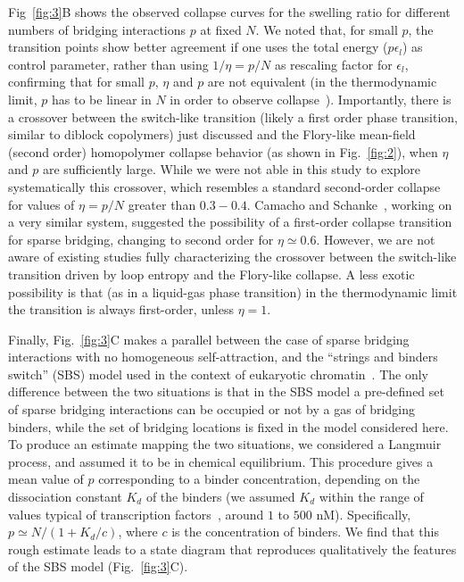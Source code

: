 \documentclass[
preprint,
a4paper,
12pt,
superscriptaddress,
pre]{revtex4}
\begin{document}
%
Fig~\ref{fig:3}B shows the observed collapse curves for the swelling
ratio for different numbers of bridging interactions $p$ at fixed
$N$. 
%
We noted that, for small $p$, the transition points show better
agreement if one uses the total energy ($p \epsilon_l$) as control
parameter, rather than using $1/\eta=p/N$ as rescaling factor for
$\epsilon_l$, confirming that for small $p$, $\eta$ and $p$ are not
equivalent (in the thermodynamic limit, $p$ has to be linear in $N$ in
order to observe collapse~\cite{Kantor1996,Camacho1997}).
%
Importantly, there is a crossover between the switch-like transition
(likely a first order phase transition, similar to diblock copolymers)
just discussed and the Flory-like mean-field (second order)
homopolymer collapse behavior (as shown in Fig.~\ref{fig:2}), when
$\eta$ and $p$ are sufficiently large.
While we were not able in this study to explore systematically this
crossover, which resembles a standard second-order collapse for values of
$\eta = p/N$ greater than $0.3-0.4$.
Camacho and Schanke~\cite{Camacho1997}, working on a very similar
system, suggested the possibility of a first-order collapse transition
for sparse bridging, changing to second order for $\eta \simeq 0.6$.
However, we are not aware of existing studies fully characterizing the
crossover between the switch-like transition driven by loop entropy
and the Flory-like collapse. A less exotic possibility is that (as in
a liquid-gas phase transition) in the thermodynamic limit the
transition is always first-order, unless $\eta=1$.
%
%



Finally, Fig.~\ref{fig:3}C makes a parallel between the case of
sparse bridging interactions with no homogeneous self-attraction, and
the ``strings and binders switch'' (SBS) model used in the context of
eukaryotic chromatin~\cite{Barbieri2012,Barbieri2013b}.
The only difference between the two situations is that in the SBS
model a pre-defined set of sparse bridging interactions can be
occupied or not by a gas of bridging binders, while the set of
bridging locations is fixed in the model considered here. To produce
an estimate mapping the two situations, we considered a Langmuir
process, and assumed it to be in chemical equilibrium.
%
This procedure gives a mean value of $p$ corresponding to a binder
concentration, depending on the dissociation constant $K_d$ of the
binders (we assumed $K_d$ within the range of values typical of
transcription factors~\cite{Buchler29042003}, around
$1$ to $500$ nM). Specifically, $p \simeq N / (1+K_d/c)$, where $c$ is the
concentration of binders.
%
We find that this rough estimate leads to a state diagram that
reproduces qualitatively the features of the SBS model
(Fig.~\ref{fig:3}C).
\end{document}
